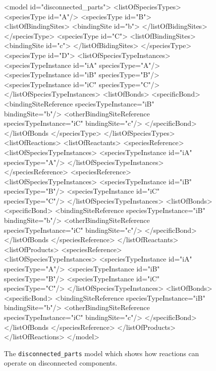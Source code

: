\documentclass{cekarticle}
\begin{document}
\begin{figure}[h]
\begin{example}
<model id="disconnected_parts">
    <listOfSpeciesTypes>
        <speciesType id="A"/>
        <speciesType id="B">
            <listOfBindingSites>
                <bindingSite id="b">
            </listOfBidingSites>
        </speciesType>
        <speciesType id="C">
            <listOfBindingSites>
                <bindingSite id="c">
            </listOfBidingSites>
        </speciesType>
        <speciesType id="D">
            <listOfSpeciesTypeInstances>
                <speciesTypeInstance id="iA" speciesType="A"/>                
                <speciesTypeInstance id="iB" speciesType="B"/>                
                <speciesTypeInstance id="iC" speciesType="C"/>                
            </listOfSpeciesTypeInstances>
            <listOfBonds>
                <specificBond>
                    <bindingSiteReference speciesTypeInstance="iB" bindingSite="b"/>
                    <otherBindingSiteReference speciesTypeInstance="iC" bindingSite="c"/>
                </specificBond>
            </listOfBonds
        </speciesType>
    </listOfSpeciesTypes>
    <listOfReactions>
        <listOfReactants>
            <speciesReference>
                <listOfSpeciesTypeInstances>
                    <speciesTypeInstance id="iA" speciesType="A"/>                
                 </listOfSpeciesTypeInstances>              
            </speciesReference>
            <speciesReference>
                <listOfSpeciesTypeInstances>
                    <speciesTypeInstance id="iB" speciesType="B"/>                
                    <speciesTypeInstance id="iC" speciesType="C"/>                
                </listOfSpeciesTypeInstances>
                <listOfBonds>
                    <specificBond>
                        <bindingSiteReference speciesTypeInstance="iB" bindingSite="b"/>
                        <otherBindingSiteReference speciesTypeInstance="iC" bindingSite="c"/>
                    </specificBond>
                </listOfBonds
            </speciesReference>
        </listOfReactants>
        <listOfProducts>
            <speciesReference>
                <listOfSpeciesTypeInstances>
                    <speciesTypeInstance id="iA" speciesType="A"/>                
                    <speciesTypeInstance id="iB" speciesType="B"/>                
                    <speciesTypeInstance id="iC" speciesType="C"/>                
                </listOfSpeciesTypeInstances>
                <listOfBonds>
                    <specificBond>
                        <bindingSiteReference speciesTypeInstance="iB" bindingSite="b"/>
                        <otherBindingSiteReference speciesTypeInstance="iC" bindingSite="c"/>
                    </specificBond>
                </listOfBonds
            </speciesReference>
        </listOfProducts>
    </listOfReactions>
</model>
\end{example}
  \caption{The \texttt{disconnected\_parts} model which shows how reactions can operate on
  disconnected components.}
  \label{fig:disconnected_parts-xml}
\end{figure}
\end{document}
